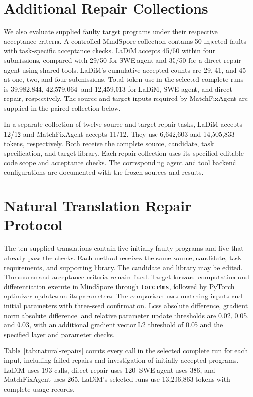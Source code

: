 \documentclass{article}
\begin{document}
\section{Additional Repair Collections}
\label{sec:additional-repair}

We also evaluate supplied faulty target programs under their respective acceptance criteria. A controlled MindSpore collection contains 50 injected faults with task-specific acceptance checks. LaDiM accepts 45/50 within four submissions, compared with 29/50 for SWE-agent and 35/50 for a direct repair agent using shared tools. LaDiM's cumulative accepted counts are 29, 41, and 45 at one, two, and four submissions. Total token use in the selected complete runs is 39,982,844, 42,579,064, and 12,459,013 for LaDiM, SWE-agent, and direct repair, respectively. The source and target inputs required by MatchFixAgent are supplied in the paired collection below.

In a separate collection of twelve source and target repair tasks, LaDiM accepts 12/12 and MatchFixAgent accepts 11/12. They use 6,642,603 and 14,505,833 tokens, respectively. Both receive the complete source, candidate, task specification, and target library. Each repair collection uses its specified editable code scope and acceptance checks. The corresponding agent and tool backend configurations are documented with the frozen sources and results.

\section{Natural Translation Repair Protocol}
\label{sec:natural-protocol}

The ten supplied translations contain five initially faulty programs and five that already pass the checks. Each method receives the same source, candidate, task requirements, and supporting library. The candidate and library may be edited. The source and acceptance criteria remain fixed. Target forward computation and differentiation execute in MindSpore through \texttt{torch4ms}, followed by PyTorch optimizer updates on its parameters. The comparison uses matching inputs and initial parameters with three-seed confirmation. Loss absolute difference, gradient norm absolute difference, and relative parameter update thresholds are 0.02, 0.05, and 0.03, with an additional gradient vector L2 threshold of 0.05 and the specified layer and parameter checks.

Table~\ref{tab:natural-repairs} counts every call in the selected complete run for each input, including failed repairs and investigation of initially accepted programs. LaDiM uses 193 calls, direct repair uses 120, SWE-agent uses 386, and MatchFixAgent uses 265. LaDiM's selected runs use 13,206,863 tokens with complete usage records.
\end{document}
